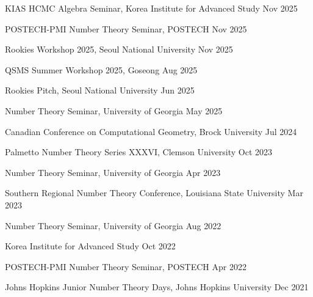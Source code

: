 \documentclass[10pt]{article}
\begin{document}
KIAS HCMC Algebra Seminar, Korea Institute for Advanced Study \hfill Nov 2025

\vspace{5pt}

POSTECH-PMI Number Theory Seminar, POSTECH \hfill Nov 2025

\vspace{5pt}

Rookies Workshop 2025, Seoul National University \hfill Nov 2025

\vspace{5pt}

QSMS Summer Workshop 2025, Goseong \hfill Aug 2025

\vspace{5pt}

Rookies Pitch, Seoul National University \hfill Jun 2025

\vspace{5pt}

Number Theory Seminar, University of Georgia \hfill May 2025

\vspace{5pt}

Canadian Conference on Computational Geometry, Brock University \hfill Jul 2024

\vspace{5pt}

Palmetto Number Theory Series XXXVI, Clemson University \hfill Oct 2023

\vspace{5pt}

Number Theory Seminar, University of Georgia \hfill Apr 2023

\vspace{5pt}

Southern Regional Number Theory Conference, Louisiana State University \hfill Mar 2023

\vspace{5pt}

Number Theory Seminar, University of Georgia \hfill Aug 2022

\vspace{5pt}

Korea Institute for Advanced Study \hfill Oct 2022

\vspace{5pt}

POSTECH-PMI Number Theory Seminar, POSTECH \hfill Apr 2022

\vspace{5pt}

Johns Hopkins Junior Number Theory Days, Johns Hopkins University \hfill Dec 2021
\end{document}
